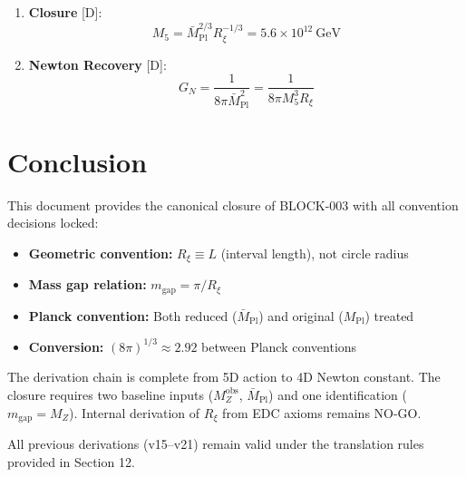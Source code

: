 \documentclass[11pt,a4paper]{article}
\newcommand{\Rxi}{R_\xi}
\newcommand{\Mpl}{M_{\mathrm{Pl}}}
\newcommand{\Mplbar}{\bar{M}_{\mathrm{Pl}}}
\newcommand{\Mfive}{M_5}
\newcommand{\GN}{G_N}
\newcommand{\MZ}{M_Z}
\newcommand{\mgap}{m_{\mathrm{gap}}}
\begin{document}
\begin{enumerate}
\item \textbf{Closure} [D]:
\begin{equation}
\Mfive = \Mplbar^{2/3} \Rxi^{-1/3} = 5.6 \times 10^{12}~\mathrm{GeV}
\end{equation}

\item \textbf{Newton Recovery} [D]:
\begin{equation}
\GN = \frac{1}{8\pi\Mplbar^2} = \frac{1}{8\pi\Mfive^3\Rxi}
\end{equation}
\end{enumerate}

\section{Conclusion}

This document provides the canonical closure of BLOCK-003 with all convention
decisions locked:

\begin{itemize}
\item \textbf{Geometric convention:} $\Rxi \equiv L$ (interval length), not circle radius
\item \textbf{Mass gap relation:} $\mgap = \pi/\Rxi$
\item \textbf{Planck convention:} Both reduced ($\Mplbar$) and original ($\Mpl$) treated
\item \textbf{Conversion:} $(8\pi)^{1/3} \approx 2.92$ between Planck conventions
\end{itemize}

The derivation chain is complete from 5D action to 4D Newton constant. The closure
requires two baseline inputs ($\MZ^{\mathrm{obs}}$, $\Mplbar$) and one identification
($\mgap = \MZ$). Internal derivation of $\Rxi$ from EDC axioms remains NO-GO.

All previous derivations (v15--v21) remain valid under the translation rules
provided in Section 12.
\end{document}
